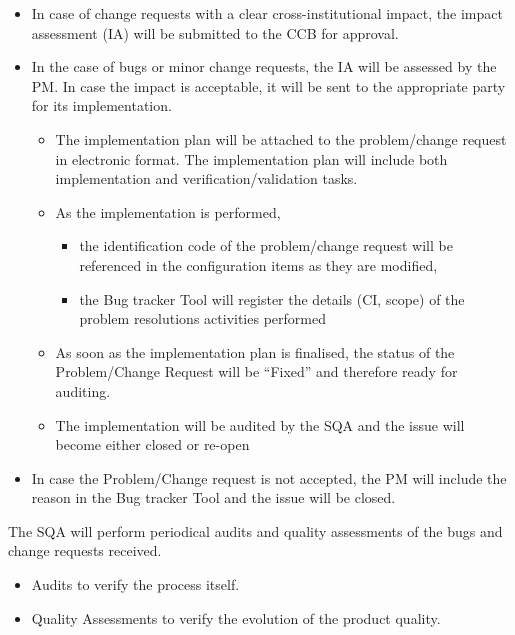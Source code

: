 \documentclass{template/openetcs_article}
\begin{document}
\begin{itemize}
\item In case of change requests with a clear cross-institutional impact, the impact assessment (IA) will be submitted to the CCB for approval.
\item In the case of bugs or minor change requests, the IA will be assessed by the PM. In case the impact is acceptable, it will be sent to the appropriate party for its implementation.
\begin{itemize}
\item The implementation plan will be attached to the problem/change request in electronic format. The implementation plan will include both implementation and verification/validation tasks.
\item As the implementation is performed, 
\begin{itemize}
\item the identification code of the problem/change request will be referenced in the configuration items as they are modified, 
\item the Bug tracker Tool will register the details (CI, scope) of the problem resolutions activities performed
\end{itemize}
\item As soon as the implementation plan is finalised, the status of the Problem/Change Request will be {\textquotedblleft}Fixed{\textquotedblright} and therefore ready for auditing.
\item The implementation will be audited by the SQA and the issue will become either closed or re-open
\end{itemize}
\item In case the Problem/Change request is not accepted, the PM will include the reason in the Bug tracker Tool and the issue will be closed. 
\end{itemize}


The SQA will perform periodical audits and quality assessments of the bugs and change requests received. 

\begin{itemize}
\item Audits to verify the process itself.
\item Quality Assessments to verify the evolution of the product quality. 
\end{itemize}
\end{document}
